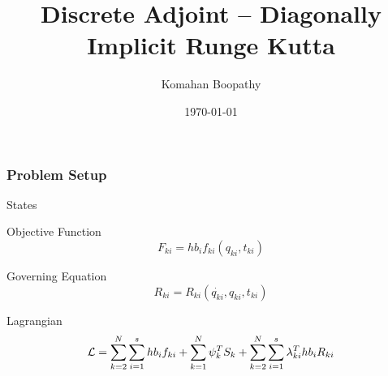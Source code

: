 \documentclass{beamer}
\title[\hspace{-0.2cm} DIRK Adjoint]
{
Discrete Adjoint -- Diagonally Implicit Runge Kutta
}
\author[Komahan Boopathy]
{
  \Large {Komahan Boopathy}\\
}
\institute
{
  \large Georgia Institute of Technology\\
 School of Aerospace Engineering\\
 Atlanta, GA
}
\date
{
\small \today
}
\begin{document}
\begin{frame}
  \titlepage
\end{frame}


\begin{frame}
\frametitle{Problem Setup}

\begin{block}{States}
\end{block}


\begin{block}{Objective Function}
  \begin{equation}\nonumber
    F_{ki} =  h b_i f_{ki}(q_{ki},t_{ki})
  \end{equation}
\end{block}

\begin{block}{Governing Equation}
  \begin{equation}\nonumber
    R_{ki} = R_{ki}(\dot{q_{ki}},q_{ki},t_{ki})
  \end{equation}
\end{block}


\begin{block}{Lagrangian}
  \begin{equation}\nonumber
    {\cal{L}} = \sum_{k=2}^{N} \sum_{i=1}^s h b_i f_{ki} + \sum_{k=1}^N \psi_k^T S_k  +  \sum_{k=2}^{N} \sum_{i=1}^s\lambda_{ki}^T  h b_i R_{ki}
  \end{equation}
\end{block}

\end{frame}
\end{document}
